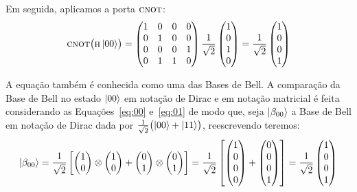 Em seguida, aplicamos a porta \(\operatorname{\textsc{cnot}}\):
\begin{equation}
  \operatorname{\textsc{cnot}} \bigl( \operatorname{\textsc{h}} \ket{00} \bigr) =
\begin{pmatrix}
1 & 0 & 0 & 0 \\
0 & 1 & 0 & 0 \\
0 & 0 & 0 & 1 \\
0 & 1 & 1 & 0
\end{pmatrix}
\frac{1}{\sqrt{2}}\begin{pmatrix}
1 \\
0 \\
1 \\
0
\end{pmatrix} = \frac{1}{\sqrt{2}} \begin{pmatrix}
1 \\
0 \\
0 \\
1
\end{pmatrix}
\end{equation}

A equação também é conhecida como uma das Bases de Bell. A comparação da Base de Bell no estado $\ket{00}$ em notação de Dirac e em notação matricial é feita considerando as Equações~\eqref{eq:00} e~\eqref{eq:01} de modo que, seja \(\ket{\beta_{00}}\) a Base de Bell em notação de Dirac dada por \(\frac{1}{\sqrt{2}} \bigl(\ket{00} + \ket{11}\bigr)\), reescrevendo teremos:
\begin{equation}\label{eq:comparacaobeta}
\ket{\beta_{00}} = \frac{1}{\sqrt{2}} \left[ \begin{pmatrix}
1 \\
0
\end{pmatrix} \otimes \begin{pmatrix}
1 \\
0
\end{pmatrix} + \begin{pmatrix}
0 \\
1
\end{pmatrix} \otimes \begin{pmatrix}
0 \\
1
\end{pmatrix}\right] = \frac{1}{\sqrt{2}} \left[ \begin{pmatrix}
1 \\
0 \\
0 \\
0 
\end{pmatrix} + \begin{pmatrix}
0 \\
0 \\
0 \\
1 
\end{pmatrix}\right] = \frac{1}{\sqrt{2}} \begin{pmatrix}
1 \\
0 \\
0 \\
1 
\end{pmatrix}
\end{equation}

